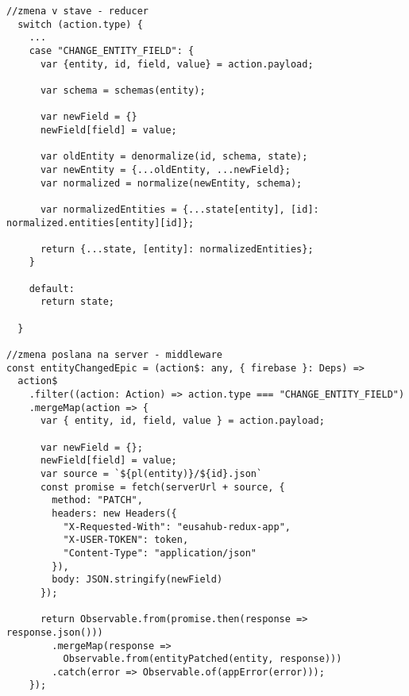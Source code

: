 \begin{lstlisting}[caption=Dotaz na server v Redux-e cez middleware, label={lst:fetchJS}]
//zmena v stave - reducer
  switch (action.type) {
  	...
    case "CHANGE_ENTITY_FIELD": {
      var {entity, id, field, value} = action.payload;

      var schema = schemas(entity);

      var newField = {}
      newField[field] = value;

      var oldEntity = denormalize(id, schema, state);
      var newEntity = {...oldEntity, ...newField};
      var normalized = normalize(newEntity, schema);

      var normalizedEntities = {...state[entity], [id]: normalized.entities[entity][id]};

      return {...state, [entity]: normalizedEntities};
    }

    default:
      return state;

  }

//zmena poslana na server - middleware
const entityChangedEpic = (action$: any, { firebase }: Deps) =>
  action$
    .filter((action: Action) => action.type === "CHANGE_ENTITY_FIELD")
    .mergeMap(action => {
      var { entity, id, field, value } = action.payload;

      var newField = {};
      newField[field] = value;
      var source = `${pl(entity)}/${id}.json`
      const promise = fetch(serverUrl + source, {
        method: "PATCH",
        headers: new Headers({
          "X-Requested-With": "eusahub-redux-app",
          "X-USER-TOKEN": token,
          "Content-Type": "application/json"
        }),
        body: JSON.stringify(newField)
      });

      return Observable.from(promise.then(response => response.json()))
        .mergeMap(response =>
          Observable.from(entityPatched(entity, response)))
        .catch(error => Observable.of(appError(error)));
    });
\end{lstlisting}